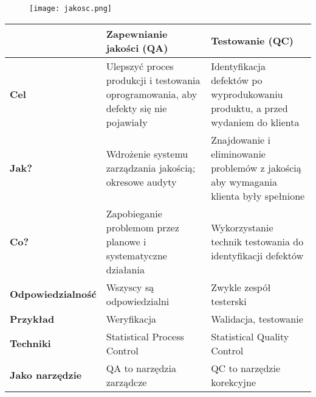 \documentclass[../main.tex]{subfiles}
\begin{document}
    \begin{figure}[H]
        \texttt{[image: jakosc.png]}
    \end{figure}

    \begin{table}[H]
        \begin{center}
            \begin{tabular}{| p{3cm} || p{6cm} | p{6cm} |}
                \hline
                & \textbf{Zapewnianie jakości (QA)} & \textbf{Testowanie (QC)}    \\
                \hline
                \hline
                \textbf{Cel} & Ulepszyć proces produkcji i testowania oprogramowania,
                aby defekty się nie pojawiały & Identyfikacja defektów po wyprodukowaniu produktu,
                a przed wydaniem do klienta \\
                \hline
                \textbf{Jak?} & Wdrożenie systemu zarządzania jakością; okresowe audyty &
                Znajdowanie i eliminowanie problemów z jakością aby wymagania klienta były spełnione \\
                \hline
                \textbf{Co?} & Zapobieganie problemom przez planowe i systematyczne działania
                & Wykorzystanie technik testowania do identyfikacji defektów \\
                \hline
                \textbf{Odpowiedzialność} & Wszyscy są odpowiedzialni         & Zwykle zespół testerski     \\
                \hline
                \textbf{Przykład}         & Weryfikacja                       & Walidacja, testowanie       \\
                \hline
                \textbf{Techniki}         & Statistical Process Control       & Statistical Quality Control \\
                \hline
                \textbf{Jako narzędzie}   & QA to narzędzia zarządcze         & QC to narzędzie korekcyjne  \\
                \hline
            \end{tabular}
        \end{center}
    \end{table}
\end{document}
